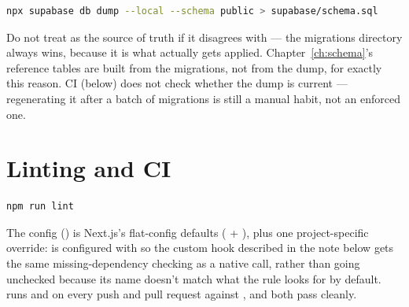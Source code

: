 \begin{lstlisting}[style=olkcodebash, language=bash, caption={Regenerating the schema dump against the local database}]
npx supabase db dump --local --schema public > supabase/schema.sql
\end{lstlisting}

\begin{olkwarn}
Do not treat  as the source of truth if it disagrees with  — the migrations directory always wins, because it is what actually gets applied. Chapter~\ref{ch:schema}'s reference tables are built from the migrations, not from the dump, for exactly this reason. CI (below) does not check whether the dump is current — regenerating it after a batch of migrations is still a manual habit, not an enforced one.
\end{olkwarn}

\section{Linting and CI}

\begin{lstlisting}[style=olkcodebash, language=bash, caption={Running the linter}]
npm run lint
\end{lstlisting}

The config () is Next.js's flat-config defaults ( + ), plus one project-specific override:  is configured with  so the custom hook described in the note below gets the same missing-dependency checking as a native  call, rather than going unchecked because its name doesn't match what the rule looks for by default.  runs  and  on every push and pull request against , and both pass cleanly.

